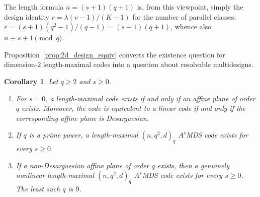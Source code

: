 \documentclass[12pt, letterpaper]{article}
\theoremstyle{plain}
\newtheorem{corollary}[theorem]{Corollary}
\theoremstyle{definition}
\begin{document}
	The length formula $n = (s+1)(q+1)$ is, from this viewpoint, simply the design identity $r = \lambda(v-1)/(K-1)$ for the number of parallel classes: $r = (s+1)(q^2-1)/(q-1) = (s+1)(q+1)$, whence also $n \equiv s+1 \pmod q$.

	Proposition~\ref{prop:2d_design_equiv} converts the existence question for dimension-$2$ length-maximal codes into a question about resolvable multidesigns.

	\begin{corollary}\label{cor:2d_existence}
		Let $q \ge 2$ and $s \ge 0$.
		\begin{enumerate}
			\item For $s = 0$, a length-maximal code exists if and only if an affine plane of order $q$ exists. Moreover, the code is equivalent to a linear code if and only if the corresponding affine plane is Desarguesian. 
			\item If $q$ is a prime power, a length-maximal $(n, q^2, d)_q$ $A^s$MDS code exists for every $s \ge 0$.
			\item If a non-Desarguesian affine plane of order $q$ exists, then a \emph{genuinely nonlinear} length-maximal $(n, q^2, d)_q$ $A^s$MDS code exists for every $s \ge 0$. The least such $q$ is $9$.
		\end{enumerate}
	\end{corollary}
\end{document}
